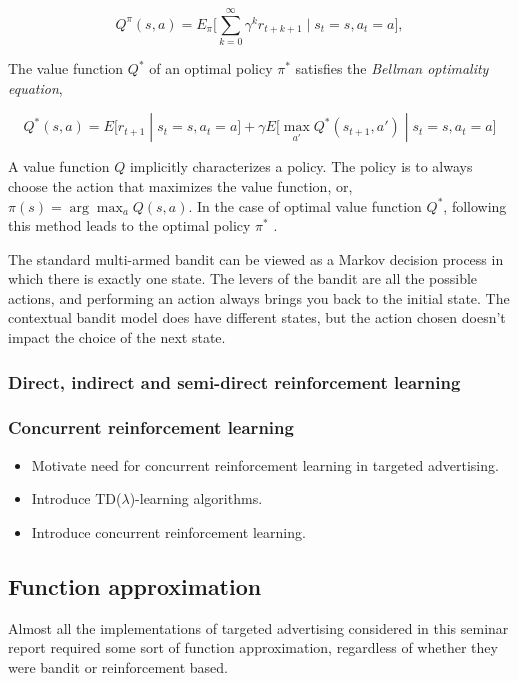 \documentclass{article} %
\begin{document}
\begin{equation}
  Q^\pi(s,a) = E_\pi \big[ \sum_{k=0}^\infty \gamma^k r_{t+k+1} \;|\; s_t = s,
  a_t = a\big],
\end{equation}

The value function $Q^*$ of an optimal policy $\pi^*$ satisfies the
\emph{Bellman optimality equation},

\begin{equation}
  Q^*(s,a) = E\big[r_{t+1} \;|\; s_t = s, a_t = a\big]
  + \gamma E\big[\max_{a'} Q^*(s_{t+1}, a') \;|\; s_t = s, a_t = a\big]
\end{equation}

A value function $Q$ implicitly characterizes a policy. The policy is to always
choose the action that maximizes the value function, or, $\pi(s) = \arg\max_a
Q(s,a)$. In the case of optimal value function $Q^*$, following this method
leads to the optimal policy $\pi^*$ \cite{abe2002empirical}.


The standard multi-armed bandit can be viewed as a Markov decision process in
which there is exactly one state. The levers of the bandit are all the possible
actions, and performing an action always brings you back to the initial state.
The contextual bandit model does have different states, but the action chosen
doesn't impact the choice of the next state.


\subsubsection{Direct, indirect and semi-direct reinforcement learning}

\subsubsection{Concurrent reinforcement learning}

\begin{itemize}
  \item{Motivate need for concurrent reinforcement learning in targeted
    advertising.}
  \item{Introduce TD($\lambda$)-learning algorithms.}
  \item{Introduce concurrent reinforcement learning.}
\end{itemize}


\subsection{Function approximation}
Almost all the implementations \cite{abe2002empirical, silver2013concurrent,
chapelle2011empirical} of targeted advertising considered in this seminar
report required some sort of function approximation, regardless of whether they
were bandit or reinforcement based.
\end{document}

